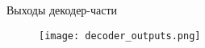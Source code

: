 
\begin{frame}{Выходы декодер-части}
\begin{figure}
\centering
\texttt{[image: decoder\_outputs.png]}
\end{figure}
\end{frame}